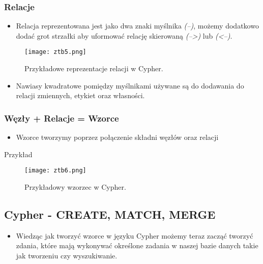 \documentclass[a4paper,15pt]{article}
\begin{document}
\subsubsection{Relacje}

\begin{itemize}
\item Relacja reprezentowana jest jako dwa znaki myślnika \textit{(--)}, możemy dodatkowo dodać grot strzałki aby uformować relację skierowaną \textit{(-->)} lub \textit{(<--)}. 
\end{itemize}

\begin{figure}[H]
\centering
  \texttt{[image: ztb5.png]}
  \caption{Przykładowe reprezentacje relacji w Cypher.}
  \label{fig:nodes}
\end{figure}
\begin{itemize}
\item Nawiasy kwadratowe pomiędzy myślnikami używane są do dodawania do relacji zmiennych, etykiet oraz własności. 
\end{itemize}


\subsubsection{Węzły + Relacje = Wzorce}
\begin{itemize}
\item Wzorce tworzymy poprzez połączenie składni węzłów oraz relacji
\end{itemize}
Przykład
\begin{figure}[H]
\centering
  \texttt{[image: ztb6.png]}
  \caption{Przykładowy wzorzec w Cypher.}
  \label{fig:nodes}
\end{figure}

\subsection{Cypher - CREATE, MATCH, MERGE}

\begin{itemize}
\item Wiedząc jak tworzyć wzorce w języku Cypher możemy teraz zacząć tworzyć zdania, które mają wykonywać określone zadania w naszej bazie danych takie jak tworzeniu czy wyszukiwanie.
\end{itemize}
\end{document}
